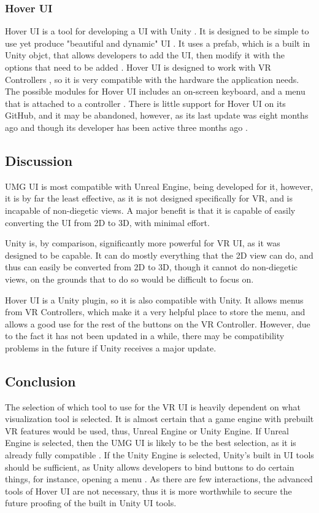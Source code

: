 \documentclass[onecolumn, draftclsnofoot,10pt, compsoc]{IEEEtran}
\begin{document}
\subsubsection{Hover UI}
Hover UI is a tool for developing a UI with Unity \cite{10}. It is designed to be simple to use yet produce "beautiful and dynamic" UI \cite{10}. It uses a prefab, which is a built in Unity objct, that allows developers to add the UI, then modify it with the options that need to be added \cite{10}. Hover UI is designed to work with VR Controllers \cite{10}, so it is very compatible with the hardware the application needs. The possible modules for Hover UI includes an on-screen keyboard, and a menu that is attached to a controller \cite{10}. There is little support for Hover UI on its GitHub, and it may be abandoned, however, as its last update was eight months ago and though its developer has been active three months ago \cite{10}. 

\subsection{Discussion}
UMG UI is most compatible with Unreal Engine, being developed for it, however, it is by far the least effective, as it is not designed specifically for VR, and is incapable of non-diegetic views. A major benefit is that it is capable of easily converting the UI from 2D to 3D, with minimal effort.

Unity is, by comparison, significantly more powerful for VR UI, as it was designed to be capable. It can do mostly everything that the 2D view can do, and thus can easily be converted from 2D to 3D, though it cannot do non-diegetic views, on the grounds that to do so would be difficult to focus on.

Hover UI is a Unity plugin, so it is also compatible with Unity. It allows menus from VR Controllers, which make it a very helpful place to store the menu, and allows a good use for the rest of the buttons on the VR Controller. However, due to the fact it has not been updated in a while, there may be compatibility problems in the future if Unity receives a major update.

\subsection{Conclusion}
The selection of which tool to use for the VR UI is heavily dependent on what visualization tool is selected. It is almost certain that a game engine with prebuilt VR features would be used, thus, Unreal Engine or Unity Engine. If Unreal Engine is selected, then the UMG UI is likely to be the best selection, as it is already fully compatible \cite{2}.
If the Unity Engine is selected, Unity's built in UI tools should be sufficient, as Unity allows developers to bind buttons to do certain things, for instance, opening a menu \cite{3}. As there are few interactions, the advanced tools of Hover UI are not necessary, thus it is more worthwhile to secure the future proofing of the built in Unity UI tools.
\end{document}
